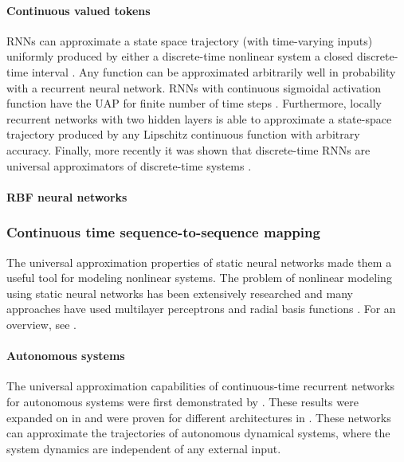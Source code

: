 \documentclass{article}
\theoremstyle{definition}
\theoremstyle{remark}
\newcounter{ct}
\begin{document}
\paragraph{Continuous valued tokens}
RNNs can approximate a state space trajectory (with time-varying inputs) uniformly  produced by either a discrete-time nonlinear system a closed discrete-time interval \citep{jin1995universal}.
Any function can be approximated arbitrarily well in probability with a recurrent neural network\citep{hammer2000approximation}.  %
RNNs with continuous sigmoidal activation function have the UAP for finite number of time steps \citep{schafer2006recurrent, schafer2007uap}.
Furthermore, locally recurrent networks with two hidden layers is able to approximate a state-space trajectory produced by any Lipschitz continuous function with arbitrary accuracy\citep{patan2008approximation}.
Finally, more recently it was shown that discrete-time RNNs are universal approximators of discrete-time systems \citep{aguiar2023universal}.

\paragraph{RBF neural networks}
\citep{tan1995efficient}



\subsubsection{Continuous time sequence-to-sequence mapping}
The universal approximation properties of static neural networks \citep{funahashi1989approximate} made them a useful tool for modeling nonlinear systems. 
The problem of nonlinear modeling using static neural networks has been extensively researched \citep{narendra1990identification,warwick1992neural} and many approaches have used multilayer perceptrons and radial basis functions \citep{chen1992neural,choi1996constructive,tan1995efficient}. 
For an overview, see \citep{garces2012strategies}.

\paragraph{Autonomous systems}
The universal approximation capabilities of continuous-time recurrent networks for autonomous systems were first demonstrated by \citet{funahashi1993approximation}. 
These results were expanded on in \citep{kimura1998learning} and were proven for different architectures in \citep{chow2000modeling}.
These networks can approximate the trajectories of autonomous dynamical systems, where the system dynamics are independent of any external input.
\end{document}
